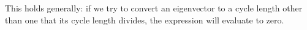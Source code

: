\documentclass[a4paper, 12pt, reqno]{amsart}
\begin{document}
	This holds generally: if we try to convert an eigenvector to a cycle length other than one that its cycle length divides, the expression will evaluate to zero. 
	
	\begin{comment}
	However,
	this isn't the only time these expressions can become zero. Even if the target cycle length is a multiple of an eigenvector's cycle length, the expression can still 
	evaluate to zero if the cycle length of the matrix $A$ has a multiple of the prime modulus in it.
	
	As an example, we'll again consider the matrix $A = 
	\left[
		\begin{smallmatrix}
			1 & 1 \\
			1 & 0
		\end{smallmatrix}
	\right]$ modulo 5. This matrix has a cycle length of 20, which is $5 \times 4$. Conveniently, this matrix has a set of eigenvectors along the span of
	$\left[
		\begin{smallmatrix}
			1 \\
			2
		\end{smallmatrix}
	\right]$ with cycle lengths of 4 and an eigenvalue of 3. If we were to compute $C_{20 \rightarrow 4}$, we'd get expressions similar to
	\begin{align*}
		       & \, (1 + 3^{4} + 3^{8} + 3^{12} + 3^{16})\vec{u}_{1} \\
		\equiv & \, (1 + 1 + 1 + 1 + 1)\vec{u}_{1}                   \\
		\equiv & \, (5)\vec{u}_{1}                                   \\
		\equiv & \, (0)\vec{u}_{1}                                   \\
		\equiv & \, \vec{0} \mod{5}
	\end{align*}
	
	When the target cycle length matches the eigenvector's cycle length, the $\lambda$ term turns into a sum of ones. If the cycle length of the matrix $A$ is a multiple
	of the prime modulus used, and the target cycle length isn't, then the sum will always contain a multiple of the prime number of ones, meaning it'll evaluate to
	zero. For LCAs with an eigenbasis, this phenomenon explains entirely why the CCMs sometimes evaluate to zero, even when vectors with the desired cycle lengths exist.
	For this particular example, there's a little more going on, since there isn't an eigenbasis under the matrix 
	$\left[
		\begin{smallmatrix}
			1 & 1 \\
			1 & 0
		\end{smallmatrix}
	\right]$ modulo 5. However, this particular matrix serves as a useful example for many of the quirks of CCMs, so it was an easy example to use.
	\end{comment}
	
\end{document}
